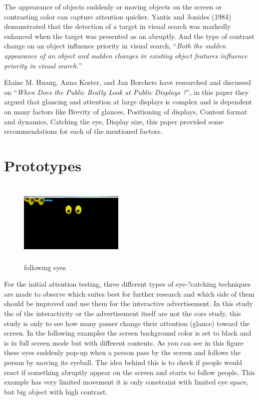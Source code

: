 The appearance of objects suddenly or moving objects on the screen or contrasting color can capture attention quicker. Yantis and Jonides (1984) demonstrated that the detection of a target in visual search was markedly enhanced when the target was presented as an abruptly\cite{capturingattention}. And the type of contrast change on an object influence priority in visual search, ``\emph{Both the sudden appearance of an object and sudden changes in existing object features influence priority in visual search.}''\cite{Luminance}

Elaine M. Huang, Anna Koster, and Jan Borchers have researched and discussed on ``\emph{When Does the Public Really Look at Public Displays ?}''\cite{WhenPublicDisplays}, in this paper they argued that glancing and attention at large displays is complex and is dependent on many factors like Brevity of glances, Positioning of displays, Content format and dynamics, Catching the eye, Display size, this paper provided some recommendations for each of the mentioned factors.


\section{Prototypes}
 
\begin{figure} %
    \centering
\includegraphics[width=50mm,height=40mm]{Figures/3/eyes}
\caption{following eyes}
\label{fig:eyes}
\end{figure} 
 
For the initial attention testing, three different types of eye-?catching techniques are made to observe which suites best for further research and which side of them should be improved and use them for the interactive advertisement. In this study the of the interactivity or the advertisement itself are not the core study, this study is only to see how many passer change their attention (glance) toward the screen. In the following examples the screen background color is set to black and is in full screen mode but with different contents. As you can see in this figure these eyes suddenly pop-up when a person pass by the screen and follows the person by moving its eyeball. The idea behind this is to check if people would react if something abruptly appear on the screen and starts to follow people, This example has very limited movement it is only constraint with limited eye space, but big object with high contrast.

